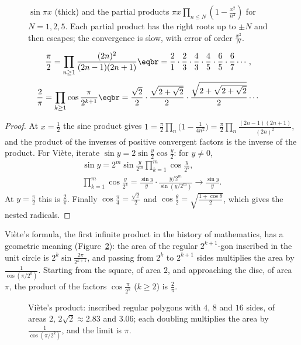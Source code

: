 \begin{figure}[ht]
\centering
{}
\caption{$\sin\pi x$ (thick) and the partial products $\pi x\prod_{n\le N}(1-\frac{x^2}{n^2})$ for $N=1,2,5$. Each partial product has
the right roots up to $\pm N$ and then escapes; the convergence is slow, with error of order $\frac{x^2}N$.}
\label{fig:sineproduct}
\end{figure}

\begin{corollary}\label{cor:wallis}
\[
\begin{aligned}\frac\pi2&=\prod_{n\ge1}\frac{(2n)^2}{(2n-1)(2n+1)}\eqbr=\frac21\cdot\frac23\cdot\frac43\cdot\frac45\cdot\frac65\cdot\frac67\cdots,\end{aligned}
\]
\[
\begin{aligned}\frac2\pi&=\prod_{k\ge1}\cos\frac\pi{2^{k+1}}\eqbr=\frac{\sqrt2}2\cdot\frac{\sqrt{2+\sqrt2}}2\cdot\frac{\sqrt{2+\sqrt{2+\sqrt2}}}2\cdots\end{aligned}
\]
\end{corollary}
\begin{proof}
At $x=\frac12$ the sine product gives $1=\frac\pi2\prod_n\bigl(1-\frac1{4n^2}\bigr)=\frac\pi2\prod_n\frac{(2n-1)(2n+1)}{(2n)^2}$, and the
product of the inverses of positive convergent factors is the inverse of the product. For Vi\`ete, iterate
$\sin y=2\sin\frac y2\cos\frac y2$: for $y\ne0$,
\[
\begin{gathered}\sin y=2^m\sin\frac y{2^m}\prod_{k=1}^m\cos\frac y{2^k},\\\prod_{k=1}^m\cos\frac y{2^k}=\frac{\sin y}{y}\cdot\frac{y/2^m}{\sin(y/2^m)}\to\frac{\sin y}y.\end{gathered}
\]
At $y=\frac\pi2$ this is $\frac2\pi$. Finally $\cos\frac\pi4=\frac{\sqrt2}2$ and $\cos\frac\theta2=\sqrt{\frac{1+\cos\theta}2}$, which gives the nested
radicals.
\end{proof}

Vi\`ete's formula, the first infinite product in the history of mathematics, has a geometric meaning
(Figure~\ref{fig:viete}): the area of the regular $2^{k+1}$-gon inscribed in the unit circle is
$2^{k}\sin\frac{2\pi}{2^{k+1}}$, and passing from $2^k$ to $2^{k+1}$ sides multiplies the area by $\frac1{\cos(\pi/2^k)}$. Starting
from the square, of area $2$, and approaching the disc, of area $\pi$, the product of the factors $\cos\frac\pi{2^k}$ ($k\ge2$)
is $\frac2\pi$.

\begin{figure}[ht]
\centering
{}
\caption{Vi\`ete's product: inscribed regular polygons with $4$, $8$ and $16$ sides, of areas $2$, $2\sqrt2\approx2.83$ and
$3.06$; each doubling multiplies the area by $\frac1{\cos(\pi/2^k)}$, and the limit is $\pi$.}
\label{fig:viete}
\end{figure}

